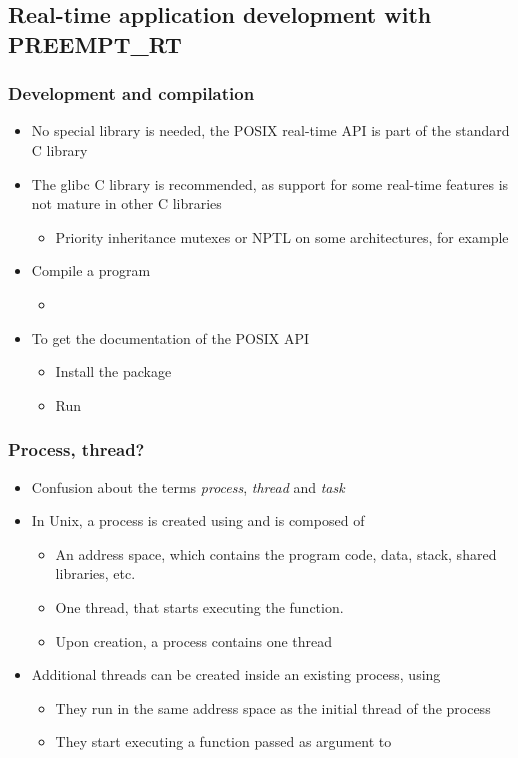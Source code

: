 \subsection{Real-time application development with PREEMPT\_RT}

\begin{frame}
  \frametitle{Development and compilation}
  \begin{itemize}
  \item No special library is needed, the POSIX real-time API is part
    of the standard C library
  \item The glibc C library is recommended, as support
    for some real-time features is not mature in other C libraries
    \begin{itemize}
    \item Priority inheritance mutexes or NPTL on some architectures,
      for example
    \end{itemize}
  \item Compile a program
    \begin{itemize}
    \item {}
    \end{itemize}
  \item To get the documentation of the POSIX API
    \begin{itemize}
    \item Install the  package
    \item Run 
    \end{itemize}
  \end{itemize}
\end{frame}

\begin{frame}
  \frametitle{Process, thread?}
  \begin{itemize}
  \item Confusion about the terms {\em process}, {\em thread} and {\em task}
  \item In Unix, a process is created using  and is composed of
    \begin{itemize}
    \item An address space, which contains the program code, data, stack, shared
      libraries, etc.
    \item One thread, that starts executing the  function.
    \item Upon creation, a process contains one thread
    \end{itemize}
  \item Additional threads can be created inside an existing process, using
    \begin{itemize}
    \item They run in the same address space as the initial thread of
      the process
    \item They start executing a function passed as argument to
    \end{itemize}
  \end{itemize}
\end{frame}

